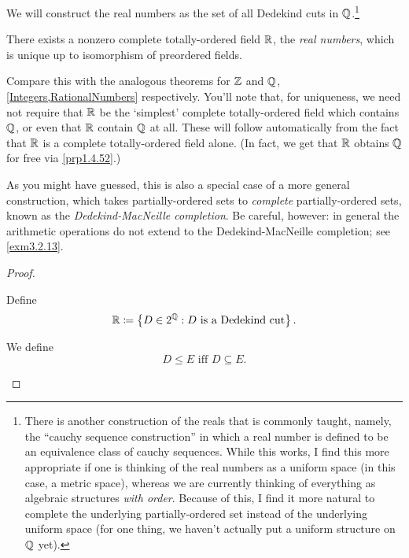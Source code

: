 We will construct the real numbers as the set of all Dedekind cuts in $\mathbb{Q}$.\footnote{There is another construction of the reals that is commonly taught, namely, the ``cauchy sequence construction'' in which a real number is defined to be an equivalence class of cauchy sequences.  While this works, I find this more appropriate if one is thinking of the real numbers as a uniform space (in this case, a metric space), whereas we are currently thinking of everything as algebraic structures \emph{with order}.  Because of this, I find it more natural to complete the underlying partially-ordered set instead of the underlying uniform space (for one thing, we haven't actually put a uniform structure on $\mathbb{Q}$ yet).}
\begin{thm}\label{RealNumbers}
There exists a nonzero complete totally-ordered field $\mathbb{R}$, the \emph{real numbers}, which is unique up to isomorphism of preordered fields.
\begin{rmk}
Compare this with the analogous theorems for $\mathbb{Z}$ and $\mathbb{Q}$, \cref{Integers,RationalNumbers} respectively.  You'll note that, for uniqueness, we need not require that $\mathbb{R}$ be the `simplest' complete totally-ordered field which contains $\mathbb{Q}$, or even that $\mathbb{R}$ contain $\mathbb{Q}$ at all.  These will follow automatically from the fact that $\mathbb{R}$ is a complete totally-ordered field alone.  (In fact, we get that $\mathbb{R}$ obtains $\mathbb{Q}$ for free via \cref{prp1.4.52}.)
\end{rmk}
\begin{rmk}
As you might have guessed, this is also a special case of a more general construction, which takes partially-ordered sets to \emph{complete} partially-ordered sets, known as the \emph{Dedekind-MacNeille completion}.  Be careful, however:  in general the arithmetic operations do not extend to the Dedekind-MacNeille completion; see \cref{exm3.2.13}.
\end{rmk}
\begin{proof}
\begin{savenotes}
Define
\begin{equation}
\mathbb{R} \coloneqq \left\{ D\in 2^{\mathbb{Q}}:D\text{ is a Dedekind cut}\right\} .
\end{equation}

We define
\begin{equation}
D\leq E\text{ iff }D\subseteq E.
\end{equation}


\end{savenotes}
\end{proof}
\end{thm}
